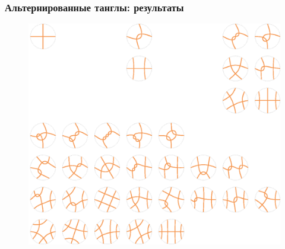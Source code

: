 \documentclass[dvips, intlimits, 9pt, unicode, notheorems, color=usenames,dvipsnames]{beamer}
\theoremstyle{plain}
\theoremstyle{definition}
\begin{document}
	\begin{frame}
		\frametitle{Альтернированные танглы: результаты}

		\begin{figure}[H]
			\centering
			\includegraphics[scale = 0.5]{c/alternating-tangles-1-4.eps}
		\end{figure}
	\end{frame}
\end{document}
